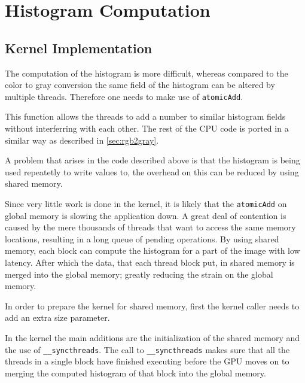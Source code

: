 \documentclass[final]{report}
\begin{document}
\chapter{Histogram Computation}

\section{Kernel Implementation}
The computation of the histogram is more difficult, whereas compared to the color to gray conversion the same field of the histogram can be altered by multiple threads.
Therefore one needs to make use of \texttt{atomicAdd\(\)}.


This function allows the threads to add a number to similar histogram fields without interferring with each other.
The rest of the CPU code is ported in a similar way as described in \cref{sec:rgb2gray}.

A problem that arises in the code described above is that the histogram is being used repeatetly to write values to, the overhead on this can be reduced by using shared memory.

Since very little work is done in the kernel, it is likely that the \texttt{atomicAdd\(\)} on global memory is slowing the application down.
A great deal of contention is caused by the mere thousands of threads that want to access the same memory locations, resulting in a long queue of pending operations.
By using shared memory, each block can compute the histogram for a part of the image with low latency.
After which the data, that each thread block put, in shared memory is merged into the global memory; greatly reducing the strain on the global memory.

In order to prepare the kernel for shared memory, first the kernel caller needs to add an extra size parameter.


In the kernel the main additions are the initialization of the shared memory and the use of \texttt{\_\_syncthreads\(\)}.
The call to \texttt{\_\_syncthreads\(\)} makes sure that all the threads in a single block have finished executing before the GPU moves on to merging the computed histogram of that block into the global memory.
\end{document}
